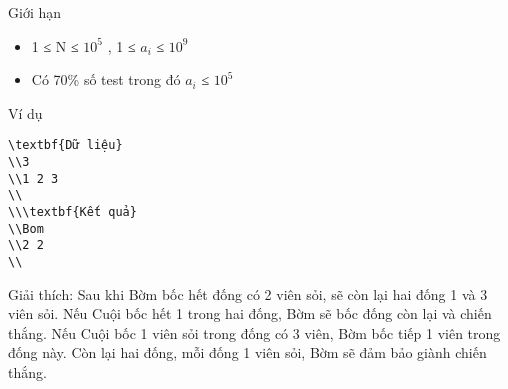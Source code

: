Giới hạn  
\begin{itemize}
	\item     1 ≤ N ≤ $10^{5}$    , 1 ≤ $a_{i}$    ≤ $10^{9}$
	\item     Có 70\% số test trong đó $a_{i}$    ≤ $10^{5}$
\end{itemize}
   Ví dụ  
\begin{verbatim}
\textbf{Dữ liệu}
\\3
\\1 2 3 
\\
\\\textbf{Kết quả}
\\Bom
\\2 2
\\\end{verbatim}

   Giải thích: Sau khi Bờm bốc hết đống có 2 viên sỏi, sẽ còn lại hai đống 1 và 3 viên sỏi. Nếu Cuội bốc hết 1 trong hai đống, Bờm sẽ bốc đống còn lại và chiến thắng. Nếu Cuội bốc 1 viên sỏi trong đống có 3 viên, Bờm bốc tiếp 1 viên trong đống này. Còn lại hai đống, mỗi đống 1 viên sỏi, Bờm sẽ đảm bảo giành chiến thắng.